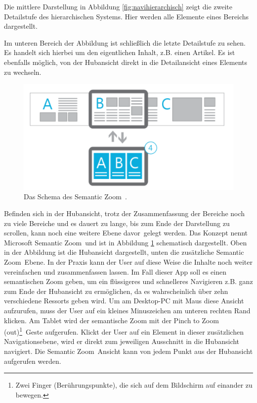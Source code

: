 \documentclass[12pt,a4paper,bibtotoc,abstracton]{scrartcl}
\begin{document}
Die mittlere Darstellung in Abbildung \ref{fig:navihierarchisch} zeigt die zweite Detailstufe des hierarchischen Systems. Hier werden alle Elemente eines Bereichs dargestellt.

Im unteren Bereich der Abbildung ist schließlich die letzte Detailstufe zu sehen. Es handelt sich hierbei um den eigentlichen Inhalt, z.B. einen Artikel. Es ist ebenfalls möglich, von der Hubansicht direkt in die Detailansicht eines Elements zu wechseln.  

\begin{figure}[h]	
	\centering
	\includegraphics[scale=1]{Bilder/Abbildungen/ms_navigation_hierarchie_semantic_zoom} 
	\caption[Das Schema des \glqq Semantic Zoom\grqq]{Das Schema des \glqq Semantic Zoom\grqq\ \protect\citep{MicrosoftNavidesign2013}.}
	\label{fig:semanticzoomkonzept}
\end{figure}

Befinden sich in der Hubansicht, trotz der Zusammenfassung der Bereiche noch zu viele Bereiche und es dauert zu lange, bis zum Ende der Darstellung zu scrollen, kann noch eine weitere Ebene \glqq davor\grqq\ gelegt werden. Das Konzept nennt Microsoft \glqq Semantic Zoom\grqq\ und ist in Abbildung \ref{fig:semanticzoomkonzept} schematisch dargestellt. Oben in der Abbildung ist die Hubansicht dargestellt, unten die zusätzliche \glqq Semantic Zoom\grqq\ Ebene. In der Praxis kann der User auf diese Weise die Inhalte noch weiter vereinfachen und zusammenfassen lassen. Im Fall dieser App soll es einen semantischen Zoom geben, um ein flüssigeres und schnelleres Navigieren z.B. ganz zum Ende der Hubansicht zu ermöglichen, da es wahrscheinlich über zehn verschiedene Ressorts geben wird. Um am Desktop-PC mit Maus diese Ansicht aufzurufen, muss der User auf ein kleines Minuszeichen am unteren rechten Rand klicken. Am Tablet wird der semantische Zoom mit der \glqq Pinch to Zoom (out)\footnote{Zwei Finger (Berührungspunkte), die sich auf dem Bildschirm auf einander zu bewegen.}\grqq\  Geste aufgerufen. Klickt der User auf ein Element in dieser zusätzlichen Navigationsebene, wird er direkt zum jeweiligen Ausschnitt in die Hubansicht navigiert. Die \glqq Semantic Zoom\grqq\ Ansicht kann von jedem Punkt aus der Hubansicht aufgerufen werden.  
\end{document}
